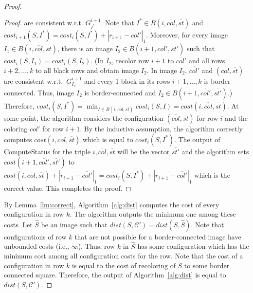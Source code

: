 \documentclass[11pt,english]{article}
\numberwithin{figure}{section}
\newcommand{\C}{{\mathcal C}}
\newcommand{\dis}{dist}
\newcommand{\Compst}{{\sf ComputeStatus}\xspace}
\begin{document}
\begin{proof}
\begin{proof}
are consistent w.r.t. $G^{i+1}_{I^*}$. Note that $I^*\in B(i,\overline{col},\overline{st})$ and $cost_{i+1}(S,I^*)=cost_i(S,I^*)+|r_{i+1}-\overline{col'}|_1$. Moreover, for every image $I_1\in B(i,\overline{col},\overline{st})$, there is an image $I_2\in B(i+1,\overline{col'},\overline{st'})$ such that $cost_i(S,I_1)=cost_i(S,I_2)$. (In $I_2$, recolor row $i+1$ to $\overline{col'}$ and all rows $i+2,\ldots, k$ to all black rows and obtain image $I_2$. In image $I_2$, $\overline{col'}$ and $(\overline{col},\overline{st})$ are consistent w.r.t.\ $G^{i+1}_{I_2}$ and every 1-block in its rows $i+1,\ldots,k$ is border-connected.  Thus, image $I_2$ is border-connected and $I_2\in B(i+1,\overline{col'},\overline{st'})$.) Therefore, $cost_i(S,I^*)=\min_{I\in B(i,\overline{col},\overline{st})}cost_i(S,I)=cost(i,\overline{col},\overline{st})$. At some point, the algorithm considers the configuration $(\overline{col},\overline{st})$ for row $i$ and the coloring $\overline{col'}$ for row $i+1$. By the inductive assumption, the algorithm correctly computes $cost(i,\overline{col},\overline{st})$ which is equal to $cost_i(S,I^*)$. The output of \Compst for the triple $i,\overline{col},\overline{st}$ will be the vector $\overline{st'}$ and the algorithm sets $cost(i+1,\overline{col'},\overline{st'})$ to $cost(i,\overline{col},\overline{st})+|r_{i+1}-\overline{col'}|_1=cost_i(S,I^*)+|r_{i+1}-\overline{col'}|_1$ which is the correct value. This completes the proof.
\end{proof}

By Lemma~\ref{lm:correct}, Algorithm~\ref{alg:dist} computes the cost of every configuration in row $k$. The algorithm outputs the minimum one among these costs. Let $\hat{S}$ be an image such that $\dis(S,\C')=\dis(S,\hat{S})$. Note that configurations of row $k$ that are not possible for a border-connected image have unbounded costs (i.e., $\infty$). Thus, row $k$ in $\hat{S}$ has some configuration which has the minimum cost among all configuration costs for the row. Note that the cost of a configuration in row $k$ is equal to the cost of recoloring of $S$ to some border connected square. Therefore, the output of Algorithm~\ref{alg:dist} is equal to $\dis(S,\C')$.


\end{proof}
\end{document}

